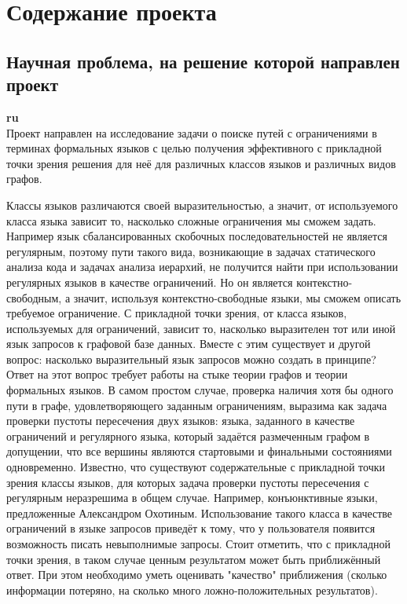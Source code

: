 \documentclass[12pt]{article}  %
\theoremstyle{remark}
\begin{document}
\section{Содержание проекта}

\subsection{Научная проблема, на решение которой направлен проект}

\textbf{ru}\\
%
Проект направлен на исследование задачи о поиске путей с ограничениями в терминах формальных языков с целью получения эффективного с прикладной точки зрения решения для неё для различных классов языков и различных видов графов.

Классы языков различаются своей выразительностью, а значит, от используемого класса языка зависит то, насколько сложные ограничения мы сможем задать. Например язык сбалансированных скобочных последовательностей не является регулярным, поэтому пути такого вида, возникающие в задачах статического анализа кода и задачах анализа иерархий, не получится найти при использовании регулярных языков в качестве ограничений. Но он является контекстно-свободным, а значит, используя контекстно-свободные языки, мы сможем описать требуемое ограничение. С прикладной точки зрения, от класса языков, используемых для ограничений, зависит то, насколько выразителен тот или иной язык запросов к графовой базе данных. Вместе с этим существует и другой вопрос: насколько выразительный язык запросов можно создать в принципе? Ответ на этот вопрос требует работы на стыке теории графов и теории формальных языков. В самом простом случае, проверка наличия хотя бы одного пути в графе, удовлетворяющего заданным ограничениям, выразима как задача проверки пустоты пересечения двух языков: языка, заданного в качестве ограничений и регулярного языка, который задаётся размеченным графом в допущении, что все вершины являются стартовыми и финальными состояниями одновременно. Известно, что существуют содержательные с прикладной точки зрения классы языков, для которых задача проверки пустоты пересечения с регулярным неразрешима в общем случае. Например, конъюнктивные языки, предложенные Александром Охотиным. Использование такого класса в качестве ограничений в языке запросов приведёт к тому, что у пользователя появится возможность писать невыполнимые запросы. Стоит отметить, что с прикладной точки зрения, в таком случае ценным результатом может быть приближённый ответ. При этом необходимо уметь оценивать "качество" приближения (сколько информации потеряно, на сколько много ложно-положительных результатов).
\end{document}
